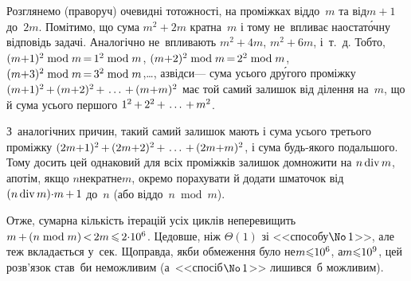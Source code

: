 \documentclass[14pt,a4paper]{extarticle}
\def\dib#1{\,#1\discretionary{}{\mbox{$#1$}}{}\,}
\begin{document}
Розглянемо (праворуч) очевидні тотожності, на проміжках від\nolinebreak[2] до~$m$ та від\nolinebreak[2] ${m{+}1}$\nolinebreak[2] до~$2m$. Помітимо, що сума ${m^2{+}2m}$ кратна~$m$ і тому не~впливає на\nolinebreak[3] остат\'{о}чну відповідь задачі.
Аналогічно не~впливають  ${m^2{+}4m}$,  ${m^2{+}6m}$, і~т.~д. Тобто, 
${(m{+}1)^2\bmod m}\dib{{=}}{1^2\bmod m}$,
${(m{+}2)^2\bmod m}\dib{{=}}{2^2\bmod m}$,
${(m{+}3)^2\bmod m}\dib{{=}}{3^2\bmod m}$,\nolinebreak[3] \dots, 
а\nolinebreak[2] звідси\nolinebreak[3] --- сума усього др\'{у}гого проміжку $(m{+}1)^2\dib{{+}}(m{+}2)^2\dib{{+}}\dots\dib{{+}}(m{+}m)^2$ має той самий залишок від ділення на~$m$, що й сума усього першого $1^2\dib{{+}}2^2\dib{{+}}\dots\dib{{+}}m^2$.

З~аналогічних причин, такий самий залишок %
мають і сума усього третього проміжку $(2m{+}1)^2\dib{{+}}(2m{+}2)^2\dib{{+}}\dots\dib{{+}}(2m{+}m)^2$, і сума будь-якого подальшого. Тому досить цей однаковий для всіх проміжків залишок домножити на ${n\mathop{\rm div}\nolimits m}$, а\nolinebreak[3] потім, якщо %
$n$\nolinebreak[2] не\nolinebreak[3] кратне\nolinebreak[3] $m$, окремо порахувати й додати шматочок від ${(n\bdiv m){\cdot}m}\dib{{+}}1$ до~$n$ (або від\nolinebreak[2] до~$n\bmod m$). 

Отже, сумарна кількість ітерацій усіх циклів не\nolinebreak[3] перевищить $m\dib{{+}}(n\bmod m)\dib{{<}}2m\dib{{\<}}{2{\cdot}10^6}$. Це\nolinebreak[3] довше, ніж $\Theta(1)$ зі <<способу\nolinebreak[3] $\No\,1$>>, але теж вкладається у~сек. Щоправда, якби обмеження було не\nolinebreak[3] ${m{\leqslant}10^6}$, а\nolinebreak[2] ${m{\leqslant}10^9}$, цей розв'язок став~би неможливим (а~<<спосіб\nolinebreak[3] $\No\,1$>> лишився~б можливим).
\end{document}
